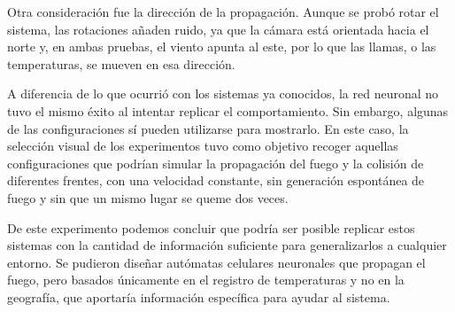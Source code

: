 	Otra consideración fue la dirección de la propagación. Aunque se probó rotar el sistema, las rotaciones añaden ruido, ya que la cámara está orientada hacia el norte y, en ambas pruebas, el viento apunta al este, por lo que las llamas, o las temperaturas, se mueven en esa dirección.

	A diferencia de lo que ocurrió con los sistemas ya conocidos, la red neuronal no tuvo el mismo éxito al intentar replicar el comportamiento. Sin embargo, algunas de las configuraciones sí pueden utilizarse para mostrarlo. En este caso, la selección visual de los experimentos tuvo como objetivo recoger aquellas configuraciones que podrían simular la propagación del fuego y la colisión de diferentes frentes, con una velocidad constante, sin generación espontánea de fuego y sin que un mismo lugar se queme dos veces.

	De este experimento podemos concluir que podría ser posible replicar estos sistemas con la cantidad de información suficiente para generalizarlos a cualquier entorno. Se pudieron diseñar autómatas celulares neuronales que propagan el fuego, pero basados únicamente en el registro de temperaturas y no en la geografía, que aportaría información específica para ayudar al sistema.
	



